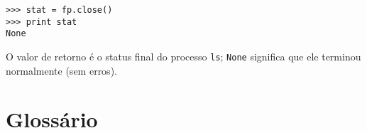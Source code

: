 
\beforeverb
\begin{verbatim}
>>> stat = fp.close()
>>> print stat
None
\end{verbatim}
\afterverb

O valor de retorno é o status final do processo {\tt ls};
{\tt None} significa que ele terminou normalmente (sem erros).

\section{Glossário}

